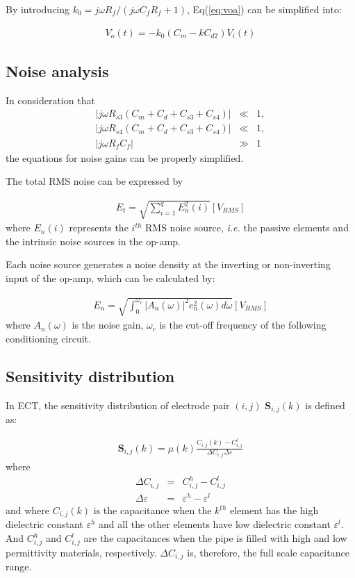 By introducing $k_0 = {j\omega R_f}/(j\omega C_f R_f +1)$, Eq(\ref{eq:voa}) can be simplified into:

\begin{eqnarray}
V_o(t) =-k_0(C_m - kC_{d2})V_i(t)
\label{eq:vob}
\end{eqnarray}


\subsection{Noise analysis}


In consideration that
\begin{eqnarray}
|j\omega R_{s3}(C_m+C_d+C_{s3}+C_{s4})| &\ll&1,\nonumber\\
|j\omega R_{s4}(C_m+C_d+C_{s3}+C_{s4})| &\ll&1,\nonumber\\
|j\omega R_fC_f| &\gg&1\nonumber
\label{eq:approx_cond}
\end{eqnarray}
the equations for noise gains can be properly simplified.

The total RMS noise can be expressed by

\begin{eqnarray}
E_{t} = \sqrt{\sum_{i=1}^{q} E_{n}^2(i)}[V_{RMS}]
\label{eq:vrms_sum}
\end{eqnarray}
where $E_{n}(i)$ represents the $i^{th}$ RMS noise source, \textit{i.e.} the passive elements and the intrinsic noise sources in the op-amp.

Each noise source generates a noise density at the inverting or non-inverting input of the op-amp, which can be  calculated by:

\begin{eqnarray}
E_n = \sqrt{\int_{0}^{\omega_c}|A_n(\omega)|^2 e_{n}^{2}(\omega)d \omega}[V_{RMS}]
\label{eq:vrms}
\end{eqnarray}
where $A_n(\omega)$ is the noise gain, $\omega_c$ is the cut-off frequency of the following conditioning circuit.

\subsection{Sensitivity distribution}

In ECT, the sensitivity distribution of electrode pair $(i, j)$ $\mathbf{S}_{i,j}(k)$ is defined as:

\begin{eqnarray}
\mathbf{S}_{i,j}(k)=\mu (k)\frac{C_{i,j}(k)-C_{i,j}^l}{\Delta C_{i,j}\Delta \varepsilon}
\label{eq:sensitivity}
\end{eqnarray}
where
\begin{eqnarray}
\Delta C_{i,j} &=&C_{i,j}^h-C_{i,j}^l\\
\Delta \varepsilon &=&\varepsilon^h-\varepsilon^l
\label{eq:sensitivity2}
\end{eqnarray}
and where $C_{i,j}(k)$ is the capacitance when the $k^{th}$ element has the high dielectric constant $\varepsilon^h$ and all the other elements have low dielectric constant $\varepsilon^l$. And $C_{i,j}^h$ and $C_{i,j}^l$ are the capacitances when the pipe is filled with  high and low permittivity materials, respectively. $\Delta C_{i,j}$ is, therefore, the full scale capacitance range.
